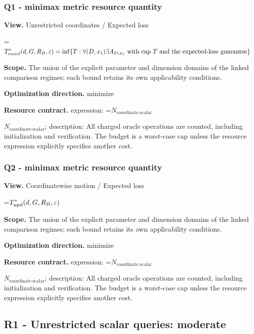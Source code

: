 \documentclass[10pt,a4paper]{article}
\newcommand{\AtlasMath}[1]{\par\begingroup\centering\setbox0=\hbox{$\displaystyle #1$}\ifdim\wd0>1.4\linewidth\typeout{ATLAS WIDE FORMULA: \the\wd0}\fi\ifdim\wd0>\linewidth\resizebox{\linewidth}{!}{\box0}\else\box0\fi\par\endgroup}
\newcommand{\AtlasInlineMath}[1]{\begingroup\setbox0=\hbox{$#1$}\ifdim\wd0>.4\linewidth\endgroup\AtlasMath{#1}\else\endgroup$#1$\fi}
\begin{document}
\subsubsection{Q1 - minimax metric resource quantity}


\textbf{View.} Unrestricted coordinates / Expected loss



\AtlasMath{T_{\rm coord}^*(d,G,R_B,\varepsilon)=\inf\{T:\forall(D,x_1)\exists A_{D,x_1}\text{ with cap }T\text{ and the expected-loss guarantee}\}}


\textbf{Scope.} The union of the explicit parameter and dimension domains of the linked comparison regimes; each bound retains its own applicability conditions.



\textbf{Optimization direction.} minimize



\textbf{Resource contract.} expression: \AtlasInlineMath{N_{\mathrm{coordinate\ scalar}}}; description: All charged oracle operations are counted, including initialization and verification. The budget is a worst-case cap unless the resource expression explicitly specifies another cost.



\subsubsection{Q2 - minimax metric resource quantity}


\textbf{View.} Coordinatewise motion / Expected loss



\AtlasMath{T_{\rm upd}^*(d,G,R_B,\varepsilon)}


\textbf{Scope.} The union of the explicit parameter and dimension domains of the linked comparison regimes; each bound retains its own applicability conditions.



\textbf{Optimization direction.} minimize



\textbf{Resource contract.} expression: \AtlasInlineMath{N_{\mathrm{coordinate\ scalar}}}; description: All charged oracle operations are counted, including initialization and verification. The budget is a worst-case cap unless the resource expression explicitly specifies another cost.



\subsection{R1 - Unrestricted scalar queries: moderate}
\end{document}
